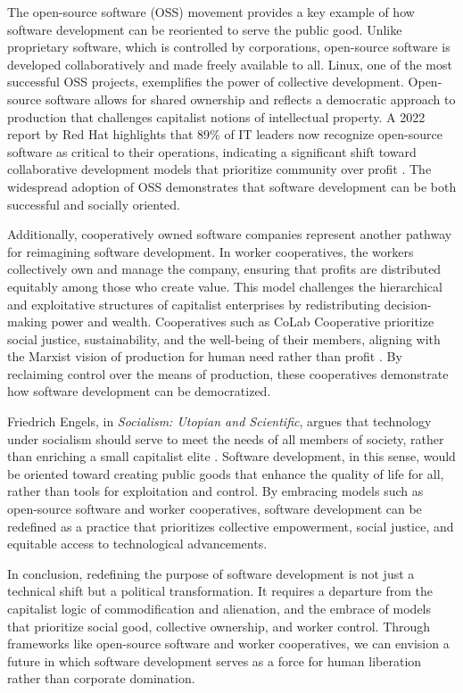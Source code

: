 \begin{refsection}
The open-source software (OSS) movement provides a key example of how software development can be reoriented to serve the public good. Unlike proprietary software, which is controlled by corporations, open-source software is developed collaboratively and made freely available to all. Linux, one of the most successful OSS projects, exemplifies the power of collective development. Open-source software allows for shared ownership and reflects a democratic approach to production that challenges capitalist notions of intellectual property. A 2022 report by Red Hat highlights that 89\% of IT leaders now recognize open-source software as critical to their operations, indicating a significant shift toward collaborative development models that prioritize community over profit \cite{redhat2022}. The widespread adoption of OSS demonstrates that software development can be both successful and socially oriented.

Additionally, cooperatively owned software companies represent another pathway for reimagining software development. In worker cooperatives, the workers collectively own and manage the company, ensuring that profits are distributed equitably among those who create value. This model challenges the hierarchical and exploitative structures of capitalist enterprises by redistributing decision-making power and wealth. Cooperatives such as CoLab Cooperative prioritize social justice, sustainability, and the well-being of their members, aligning with the Marxist vision of production for human need rather than profit \cite[pp.~45-46]{scholz2017}. By reclaiming control over the means of production, these cooperatives demonstrate how software development can be democratized.

Friedrich Engels, in \textit{Socialism: Utopian and Scientific}, argues that technology under socialism should serve to meet the needs of all members of society, rather than enriching a small capitalist elite \cite[pp.~224-226]{engels1880}. Software development, in this sense, would be oriented toward creating public goods that enhance the quality of life for all, rather than tools for exploitation and control. By embracing models such as open-source software and worker cooperatives, software development can be redefined as a practice that prioritizes collective empowerment, social justice, and equitable access to technological advancements.

In conclusion, redefining the purpose of software development is not just a technical shift but a political transformation. It requires a departure from the capitalist logic of commodification and alienation, and the embrace of models that prioritize social good, collective ownership, and worker control. Through frameworks like open-source software and worker cooperatives, we can envision a future in which software development serves as a force for human liberation rather than corporate domination.


\end{refsection}
